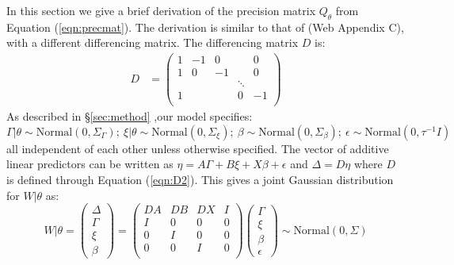 \documentclass[ba]{imsart}
\begin{document}
In this section we give a brief derivation of the precision matrix $Q_{\theta}$ from Equation (\ref{eqn:precmat}). The derivation is similar to that of \cite{casecross} (Web Appendix C), with a different differencing matrix. The differencing matrix $D$ is:
\begin{equation}\begin{aligned}\label{eqn:D2}
D &= \begin{pmatrix}
1 & -1 & 0 & & 0 \\
1 & 0 & -1 & & 0 \\
  &    &  & \ddots  &   \\
1 &    &       & 0 & -1 \\
\end{pmatrix}
\end{aligned}\end{equation}
As described in \S\ref{sec:method} ,our model specifies:
\begin{equation*}
\Gamma|\theta \sim \text{Normal}\left( 0,\Sigma_{\Gamma}\right); \ \xi|\theta \sim \text{Normal}\left( 0,\Sigma_{\xi}\right); \ \beta \sim \text{Normal}\left( 0,\Sigma_{\beta}\right); \ \epsilon \sim \text{Normal}\left( 0,\tau^{-1}I\right)
\end{equation*}
all independent of each other unless otherwise specified. The vector of additive linear predictors can be written as $\eta = A\Gamma + B\xi + X\beta + \epsilon$ and $\Delta = D\eta$ where $D$ is defined through Equation (\ref{eqn:D2}). This gives a joint Gaussian distribution for $W|\theta$ as:
\begin{equation*}
W|\theta = \begin{pmatrix} \Delta \\ \Gamma \\ \xi \\\beta \end{pmatrix} = \begin{pmatrix} DA & DB & DX & I \\ I & 0 & 0 & 0 \\ 0 & I & 0 & 0 \\ 0 & 0 & I & 0 \\ \end{pmatrix}\begin{pmatrix}\Gamma\\ \xi \\ \beta \\ \epsilon \end{pmatrix} 
\sim \text{Normal}\left( 0,\Sigma\right)
\end{equation*}
\end{document}
